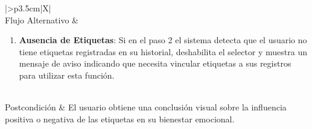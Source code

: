 \begin{xltabular}{\textwidth}{|>{\bfseries}p{3.5cm}|X|}
    \\ \hline
    Flujo Alternativo & 
    \begin{enumerate}[leftmargin=0.5cm, topsep=0pt, partopsep=0pt, parsep=0pt, itemsep=4pt]
        \item \textbf{Ausencia de Etiquetas}: Si en el paso 2 el sistema detecta que el usuario no tiene etiquetas registradas en su historial, deshabilita el selector y muestra un mensaje de aviso indicando que necesita vincular etiquetas a sus registros para utilizar esta función.
    \end{enumerate}
    \\ \hline
    Postcondición & El usuario obtiene una conclusión visual sobre la influencia positiva o negativa de las etiquetas en su bienestar emocional. \\ \hline

    \caption{CU13: Analizar Impacto de Etiquetas}
    \label{tab:esp_cu13} \\
\end{xltabular}
\endgroup

